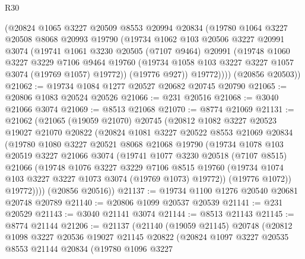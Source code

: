 \begin{lexlean}{R30}
\begin{coremodule}
        (@20824
          @1065
          @3227
          @20509
          @8553
          @20994
          @20834
          (@19780
            @1064
            @3227
            @20508
            @8068
            @20993
            @19790
            (@19734
              @1062
              @103
              @20506
              @3227
              @20991
              @3074
              (@19741
                @1061
                @3230
                @20505
                (@7107 @9464)
                @20991
                (@19748
                  @1060
                  @3227
                  @3229
                  @7106
                  @9464
                  @19760
                  (@19734 @1058 @103 @3227 @3227 @1057 @3074 (@19769 @1057) @19772))
                (@19776 @927))
              @19772))))
      (@20856 @20503))
@21062 := @19734 @1084 @1277 @20527 @20682 @20745 @20790
@21065 := @20806 @1083 @20524 @20526
@21066 := @231 @20516
@21068 := @3040 @21066 @3074
@21069 := @8513 @21068
@21070 := @8774 @21069
@21131 := @21062
    (@21065
      (@19059 @21070)
      @20745
      (@20812
        @1082
        @3227
        @20523
        @19027
        @21070
        @20822
        (@20824
          @1081
          @3227
          @20522
          @8553
          @21069
          @20834
          (@19780
            @1080
            @3227
            @20521
            @8068
            @21068
            @19790
            (@19734
              @1078
              @103
              @20519
              @3227
              @21066
              @3074
              (@19741
                @1077
                @3230
                @20518
                (@7107 @8515)
                @21066
                (@19748
                  @1076
                  @3227
                  @3229
                  @7106
                  @8515
                  @19760
                  (@19734 @1074 @103 @3227 @3227 @1073 @3074 (@19769 @1073) @19772))
                (@19776 @1072))
              @19772))))
      (@20856 @20516))
@21137 := @19734 @1100 @1276 @20540 @20681 @20748 @20789
@21140 := @20806 @1099 @20537 @20539
@21141 := @231 @20529
@21143 := @3040 @21141 @3074
@21144 := @8513 @21143
@21145 := @8774 @21144
@21206 := @21137
    (@21140
      (@19059 @21145)
      @20748
      (@20812
        @1098
        @3227
        @20536
        @19027
        @21145
        @20822
        (@20824
          @1097
          @3227
          @20535
          @8553
          @21144
          @20834
          (@19780
            @1096
            @3227

\end{coremodule}
\end{lexlean}
